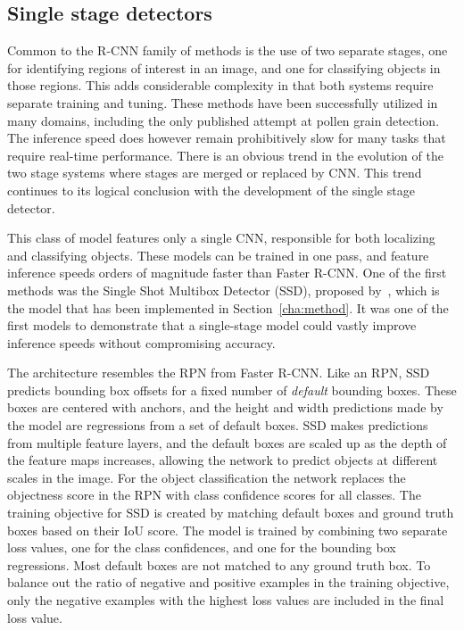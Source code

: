 \subsection{Single stage detectors}\label{sec:ssd}
Common to the R-CNN family of methods is the use of two separate stages, one for identifying regions of interest in an image, and one for classifying objects in those regions.
This adds considerable complexity in that both systems require separate training and tuning.
These methods have been successfully utilized in many domains, including the only published attempt at pollen grain detection.
The inference speed does however remain prohibitively slow for many tasks that require real-time performance.
There is an obvious trend in the evolution of the two stage systems where stages are merged or replaced by CNN\@.
This trend continues to its logical conclusion with the development of the single stage detector.

This class of model features only a single CNN, responsible for both localizing and classifying objects.
These models can be trained in one pass, and feature inference speeds orders of magnitude faster than Faster R-CNN\@.
One of the first methods was the Single Shot Multibox Detector (SSD), proposed by\ \cite{liu_ssd_2016}, which is the model that has been implemented in Section~\ref{cha:method}.
It was one of the first models to demonstrate that a single-stage model could vastly improve inference speeds without compromising accuracy. 

The architecture resembles the RPN from Faster R-CNN\@.
Like an RPN, SSD predicts bounding box offsets for a fixed number of \textit{default} bounding boxes.
These boxes are centered with anchors, and the height and width predictions made by the model are regressions from a set of default boxes.
SSD makes predictions from multiple feature layers, and the default boxes are scaled up as the depth of the feature maps increases, allowing the network to predict objects at different scales in the image.
For the object classification the network replaces the objectness score in the RPN with class confidence scores for all classes.
The training objective for SSD is created by matching default boxes and ground truth boxes based on their IoU score.
The model is trained by combining two separate loss values, one for the class confidences, and one for the bounding box regressions.
Most default boxes are not matched to any ground truth box.
To balance out the ratio of negative and positive examples in the training objective, only the negative examples with the highest loss values are included in the final loss value.

